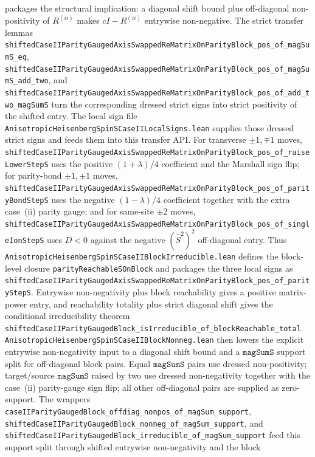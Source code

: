 \documentclass[a4paper,11pt]{article}
\begin{document}
packages the structural implication: a diagonal shift bound plus
off-diagonal non-positivity of \(R^{(ii)}\) makes \(cI-R^{(ii)}\) entrywise
non-negative.  The strict transfer lemmas
\texttt{shiftedCaseIIParityGaugedAxisSwappedReMatrixOnParityBlock\_pos\_of\_magSumS\_eq},
\texttt{shiftedCaseIIParityGaugedAxisSwappedReMatrixOnParityBlock\_pos\_of\_magSumS\_add\_two},
and
\texttt{shiftedCaseIIParityGaugedAxisSwappedReMatrixOnParityBlock\_pos\_of\_add\_two\_magSumS}
turn the corresponding dressed strict signs into strict positivity of the
shifted entry.  The local sign file
\texttt{AnisotropicHeisenbergSpinSCaseIILocalSigns.lean} supplies those
dressed strict signs and feeds them into this transfer API.  For transverse
\(\pm1,\mp1\) moves,
\texttt{shiftedCaseIIParityGaugedAxisSwappedReMatrixOnParityBlock\_pos\_of\_raiseLowerStepS}
uses the positive \((1+\lambda)/4\) coefficient and the Marshall sign flip;
for parity-bond \(\pm1,\pm1\) moves,
\texttt{shiftedCaseIIParityGaugedAxisSwappedReMatrixOnParityBlock\_pos\_of\_parityBondStepS}
uses the negative \((1-\lambda)/4\) coefficient together with the extra
case~(ii) parity gauge; and for same-site \(\pm2\) moves,
\texttt{shiftedCaseIIParityGaugedAxisSwappedReMatrixOnParityBlock\_pos\_of\_singleIonStepS}
uses \(D<0\) against the negative \((\hat S^2)^2\) off-diagonal entry.  Thus
\texttt{AnisotropicHeisenbergSpinSCaseIIBlockIrreducible.lean} defines the
block-level closure
\texttt{parityReachableSOnBlock} and packages the three local signs as
\texttt{shiftedCaseIIParityGaugedAxisSwappedReMatrixOnParityBlock\_pos\_of\_parityStepS}.
Entrywise non-negativity plus block reachability gives a positive matrix-power
entry, and reachability totality plus strict diagonal shift gives the
conditional irreducibility theorem
\texttt{shiftedCaseIIParityGaugedBlock\_isIrreducible\_of\_blockReachable\_total}.
\texttt{AnisotropicHeisenbergSpinSCaseIIBlockNonneg.lean} then lowers the
explicit entrywise non-negativity input to a diagonal shift bound and a
\(\texttt{magSumS}\) support split for off-diagonal block pairs.  Equal
\(\texttt{magSumS}\) pairs use dressed non-positivity; target/source
\(\texttt{magSumS}\) raised by two use dressed non-negativity together with the
case~(ii) parity-gauge sign flip; all other off-diagonal pairs are supplied as
zero-support.  The wrappers
\texttt{caseIIParityGaugedBlock\_offdiag\_nonpos\_of\_magSum\_support},
\texttt{shiftedCaseIIParityGaugedBlock\_nonneg\_of\_magSum\_support}, and
\texttt{shiftedCaseIIParityGaugedBlock\_irreducible\_of\_magSum\_support}
feed this support split through shifted entrywise non-negativity and the block
\end{document}
